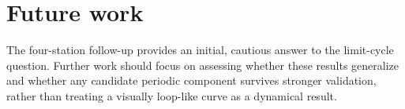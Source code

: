 \documentclass[11pt,a4paper]{article}
\begin{document}



\section{Future work}

The four-station follow-up provides an initial, cautious answer to the limit-cycle question. Further work should focus on assessing whether these results generalize and whether any candidate periodic component survives stronger validation, rather than treating a visually loop-like curve as a dynamical result.
\end{document}
